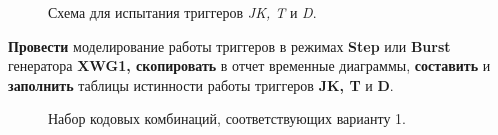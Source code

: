 \documentclass[bachelor, och, otchet, hidelinks]{SCWorks}
\begin{document}
\begin{figure}[h]
	\caption{Схема для испытания триггеров \textit{JK, T} и \textit{D}.}
\end{figure}

\newpage

\textbf{Провести} моделирование работы триггеров в режимах \textbf{Step} или \textbf{Burst} генератора
\textbf{XWG1, скопировать} в отчет временные диаграммы, \textbf{составить} и \textbf{заполнить} таблицы
истинности работы триггеров \textbf{JK, T} и \textbf{D}. 

\begin{figure}[h]
	\caption{Набор кодовых комбинаций, соответствующих варианту 1.}
\end{figure}
\end{document}
